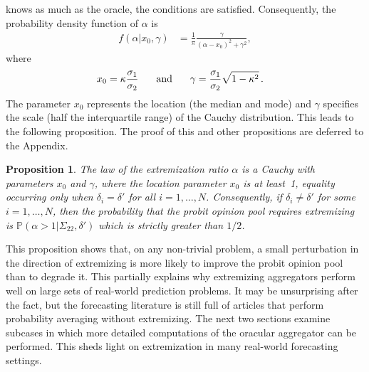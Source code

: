 \documentclass[11pt]{article}
\renewcommand{\P}{\mathbb{P}}
\newtheorem{proposition}[theorem]{Proposition}
\theoremstyle{definition}
\theoremstyle{definition}
\def\P{{\mathbb P}}
\begin{document}
knows as much as the oracle, the conditions are satisfied. 
Consequently, the probability density function of $\alpha$ is
\begin{align*}
f(\alpha | x_0, \gamma) &= \frac{1}{\pi} 
  \frac{\gamma}{(\alpha-x_0)^2+\gamma^2}, 
\end{align*}
where 
\begin{align*}
x_0 = \kappa \frac{\sigma_1}{\sigma_2} \hspace{0.2in} \mbox{ and } 
  \hspace{0.2in} \gamma &= \frac{\sigma_1}{\sigma_2} \sqrt{1-\kappa^2} \, .
\end{align*}
The parameter $x_0$ represents the location (the median and mode) and 
$\gamma$ specifies the scale (half the interquartile range) of the 
Cauchy distribution. This leads to the following proposition. 
The proof of this and other propositions are deferred to the Appendix.

\begin{proposition}
\label{positiveProbThm}
The law of the extremization ratio $\alpha$ is a Cauchy with 
parameters $x_0$ and $\gamma$, where the location parameter 
$x_0$ is at least~1, equality occurring only when $\delta_i = \delta'$ 
for all $i = 1, \dots, N$. Consequently, if $\delta_i \neq \delta'$ 
for some $i = 1, \dots, N$, then the probability that the probit 
opinion pool requires extremizing is $\P(\alpha > 1 | \Sigma_{22}, \delta')$
which is strictly greater than $1/2$. 
\end{proposition}
\noindent
This proposition shows that, on any non-trivial problem, a small
perturbation in the direction of extremizing is more likely to 
improve the probit opinion pool than to degrade it.  This partially 
explains why extremizing aggregators perform well on large sets of 
real-world prediction problems.  It may be unsurprising after the fact,
but the forecasting literature is still full of articles that perform 
probability averaging without extremizing.  The next two 
sections examine subcases in which more detailed computations of the oracular aggregator can be performed. This sheds light on extremization in many real-world forecasting settings.  
\end{document}
